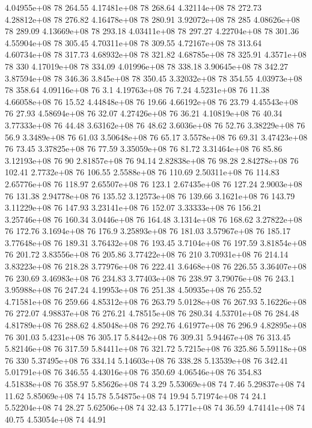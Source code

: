 4.04955e+08 78 264.55
4.17481e+08 78 268.64
4.32114e+08 78 272.73
4.28812e+08 78 276.82
4.16478e+08 78 280.91
3.92072e+08 78 285
4.08626e+08 78 289.09
4.13669e+08 78 293.18
4.03411e+08 78 297.27
4.22704e+08 78 301.36
4.55904e+08 78 305.45
4.70311e+08 78 309.55
4.72167e+08 78 313.64
4.60734e+08 78 317.73
4.68932e+08 78 321.82
4.68785e+08 78 325.91
4.3571e+08 78 330
4.17019e+08 78 334.09
4.01996e+08 78 338.18
3.90645e+08 78 342.27
3.87594e+08 78 346.36
3.845e+08 78 350.45
3.32032e+08 78 354.55
4.03973e+08 78 358.64
4.09116e+08 76 3.1
4.19763e+08 76 7.24
4.5231e+08 76 11.38
4.66058e+08 76 15.52
4.44848e+08 76 19.66
4.66192e+08 76 23.79
4.45543e+08 76 27.93
4.58694e+08 76 32.07
4.27426e+08 76 36.21
4.10819e+08 76 40.34
3.77333e+08 76 44.48
3.63162e+08 76 48.62
3.6036e+08 76 52.76
3.38229e+08 76 56.9
3.3489e+08 76 61.03
3.50648e+08 76 65.17
3.5578e+08 76 69.31
3.47423e+08 76 73.45
3.37825e+08 76 77.59
3.35059e+08 76 81.72
3.31464e+08 76 85.86
3.12193e+08 76 90
2.81857e+08 76 94.14
2.82838e+08 76 98.28
2.84278e+08 76 102.41
2.7732e+08 76 106.55
2.5588e+08 76 110.69
2.50311e+08 76 114.83
2.65776e+08 76 118.97
2.65507e+08 76 123.1
2.67435e+08 76 127.24
2.9003e+08 76 131.38
2.94778e+08 76 135.52
3.12573e+08 76 139.66
3.1621e+08 76 143.79
3.11229e+08 76 147.93
3.23141e+08 76 152.07
3.33333e+08 76 156.21
3.25746e+08 76 160.34
3.0446e+08 76 164.48
3.1314e+08 76 168.62
3.27822e+08 76 172.76
3.1694e+08 76 176.9
3.25893e+08 76 181.03
3.57967e+08 76 185.17
3.77648e+08 76 189.31
3.76432e+08 76 193.45
3.7104e+08 76 197.59
3.81854e+08 76 201.72
3.83556e+08 76 205.86
3.77422e+08 76 210
3.70931e+08 76 214.14
3.83223e+08 76 218.28
3.77976e+08 76 222.41
3.6468e+08 76 226.55
3.36407e+08 76 230.69
3.46983e+08 76 234.83
3.77403e+08 76 238.97
3.79076e+08 76 243.1
3.95988e+08 76 247.24
4.19953e+08 76 251.38
4.50935e+08 76 255.52
4.71581e+08 76 259.66
4.85312e+08 76 263.79
5.0128e+08 76 267.93
5.16226e+08 76 272.07
4.98837e+08 76 276.21
4.78515e+08 76 280.34
4.53701e+08 76 284.48
4.81789e+08 76 288.62
4.85048e+08 76 292.76
4.61977e+08 76 296.9
4.82895e+08 76 301.03
5.4231e+08 76 305.17
5.8442e+08 76 309.31
5.94467e+08 76 313.45
5.82146e+08 76 317.59
5.84411e+08 76 321.72
5.7215e+08 76 325.86
5.59118e+08 76 330
5.37495e+08 76 334.14
5.14603e+08 76 338.28
5.13539e+08 76 342.41
5.01791e+08 76 346.55
4.43016e+08 76 350.69
4.06546e+08 76 354.83
4.51838e+08 76 358.97
5.85626e+08 74 3.29
5.53069e+08 74 7.46
5.29837e+08 74 11.62
5.85069e+08 74 15.78
5.54875e+08 74 19.94
5.71974e+08 74 24.1
5.52204e+08 74 28.27
5.62506e+08 74 32.43
5.1771e+08 74 36.59
4.74141e+08 74 40.75
4.53054e+08 74 44.91
